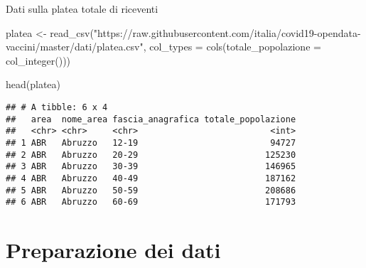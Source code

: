 \documentclass[
]{article}
\newenvironment{Shaded}{\begin{snugshade}}{\end{snugshade}}
\newcommand{\AttributeTok}[1]{\textcolor[rgb]{0.77,0.63,0.00}{#1}}
\newcommand{\FunctionTok}[1]{\textcolor[rgb]{0.00,0.00,0.00}{#1}}
\newcommand{\NormalTok}[1]{#1}
\newcommand{\OtherTok}[1]{\textcolor[rgb]{0.56,0.35,0.01}{#1}}
\newcommand{\StringTok}[1]{\textcolor[rgb]{0.31,0.60,0.02}{#1}}
\begin{document}
Dati sulla platea totale di riceventi

\begin{Shaded}
\begin{Highlighting}[]
\NormalTok{platea }\OtherTok{\textless{}{-}} \FunctionTok{read\_csv}\NormalTok{(}\StringTok{"https://raw.githubusercontent.com/italia/covid19{-}opendata{-}vaccini/master/dati/platea.csv"}\NormalTok{, }
    \AttributeTok{col\_types =} \FunctionTok{cols}\NormalTok{(}\AttributeTok{totale\_popolazione =} \FunctionTok{col\_integer}\NormalTok{()))}

\FunctionTok{head}\NormalTok{(platea)}
\end{Highlighting}
\end{Shaded}

\begin{verbatim}
## # A tibble: 6 x 4
##   area  nome_area fascia_anagrafica totale_popolazione
##   <chr> <chr>     <chr>                          <int>
## 1 ABR   Abruzzo   12-19                          94727
## 2 ABR   Abruzzo   20-29                         125230
## 3 ABR   Abruzzo   30-39                         146965
## 4 ABR   Abruzzo   40-49                         187162
## 5 ABR   Abruzzo   50-59                         208686
## 6 ABR   Abruzzo   60-69                         171793
\end{verbatim}

\hypertarget{preparazione-dei-dati}{%
\section{Preparazione dei dati}\label{preparazione-dei-dati}}
\end{document}

